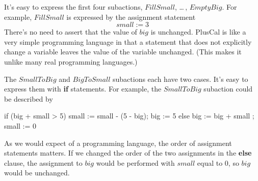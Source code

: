 It's easy to express the
first four subactions, $FillSmall$, \ldots\,, $EmptyBig$.  For example,
$FillSmall$ is expressed by the assignment statement
 \[ small := 3 \]
There's no need to assert that the value of $big$ is unchanged.
PlusCal is like a very simple programming language in that a statement
that does not explicitly change a variable leaves the value of the
variable unchanged.  (This makes it unlike many real programming
languages.)

The $SmallToBig$ and $BigToSmall$ subactions each have two cases.
It's easy to express them with \textbf{if} statements.  For example,
the $SmallToBig$ subaction could be described by
\begin{display}
\begin{nopcal}
if (big + small > 5) { small := small - (5 - big); 
                       big := 5                     }
else { big := big + small ;
       small := 0           }
\end{nopcal}
\begin{tlatex}
%
%
\end{tlatex}
\end{display}
As we would expect of a programming language, the order of assignment
statements matters.  If we changed the order of the two assignments in
the \textbf{else} clause, the assignment to $big$ would be performed
with $small$ equal to 0, so $big$ would be unchanged.

